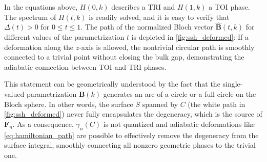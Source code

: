 In the equations above, $H(0,k)$ describes a TRI and $H(1,k)$ a TOI phase.
The spectrum of $H(t,k)$ is readily solved, and it is easy to verify that $\Delta({t})>0$ for $0\leq t\leq1$.
The path of the normalized Bloch vector $\hat{\bm B}(t,k)$ for different values of the parametrization $t$ is depicted in \cref{fig:ssh_deformed}:
If a deformation along the $z$-axis is allowed, the nontrivial circular path is smoothly connected to a trivial point without closing the bulk gap, demonstrating the adiabatic connection between TOI and TRI phases.

This statement can be geometrically understood by the fact that the single-valued parametrization $\bm B(k)$ generates an arc of a circle or a full circle on the Bloch sphere.
In other words, the surface $S$ spanned by $C$ (the white path in \cref{fig:ssh_deformed}) never fully encapsulates the degeneracy, which is the source of ${\bm F}_n$.
As a consequence, $\gamma_n(C)$ is not quantized and adiabatic deformations like \cref{eq:hamiltonian_path} are possible to effectively remove the degeneracy from the surface integral, smoothly connecting all nonzero geometric phases to the trivial one.
